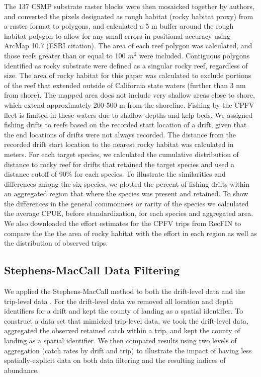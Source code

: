 \documentclass[
  12pt,
  authoryear,
  preprint,
  3p]{elsarticle}
\begin{document}
The 137 CSMP substrate raster blocks were then mosaicked together by
authors, and converted the pixels designated as rough habitat (rocky
habitat proxy) from a raster format to polygons, and calculated a 5 m
buffer around the rough habitat polygon to allow for any small errors in
positional accuracy using ArcMap 10.7 (ESRI citation). The area of each
reef polygon was calculated, and those reefs greater than or equal to
100 \(m^2\) were included. Contiguous polygons identified as rocky
substrate were defined as a singular rocky reef, regardless of size. The
area of rocky habitat for this paper was calculated to exclude portions
of the reef that extended outside of California state waters (further
than 3 nm from shore). The mapped area does not include very shallow
areas close to shore, which extend approximately 200-500 m from the
shoreline. Fishing by the CPFV fleet is limited in these waters due to
shallow depths and kelp beds. We assigned fishing drifts to reefs based
on the recorded start location of a drift, given that the end locations
of drifts were not always recorded. The distance from the recorded drift
start location to the nearest rocky habitat was calculated in meters.
For each target species, we calculated the cumulative distribution of
distance to rocky reef for drifts that retained the target species and
used a distance cutoff of 90\% for each species. To illustrate the
similarities and differences among the six species, we plotted the
percent of fishing drifts within an aggregated region that where the
species was present and retained. To show the differences in the general
commonness or rarity of the species we calculated the average CPUE,
before standardization, for each species and aggregated area. We also
downloaded the effort estimates for the CPFV trips from RecFIN to
compare the the the area of rocky habitat with the effort in each region
as well as the distribution of observed trips.

\hypertarget{stephens-maccall-data-filtering}{%
\subsection{Stephens-MacCall Data
Filtering}\label{stephens-maccall-data-filtering}}

We applied the Stephens-MacCall method to both the drift-level data and
the trip-level data \citeyearpar{Stephens:2004:MAS}. For the drift-level
data we removed all location and depth identifiers for a drift and kept
the county of landing as a spatial identifier. To construct a data set
that mimicked trip-level data, we took the drift-level data, aggregated
the observed retained catch within a trip, and kept the county of
landing as a spatial identifier. We then compared results using two
levels of aggregation (catch rates by drift and trip) to illustrate the
impact of having less spatially-explicit data on both data filtering and
the resulting indices of abundance.
\end{document}
